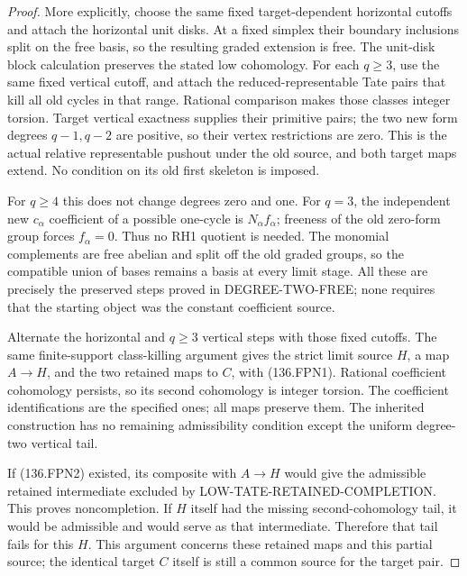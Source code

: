 \begin{proof}
More explicitly, choose the same fixed target-dependent horizontal
cutoffs and attach the horizontal unit disks. At a fixed simplex
their boundary inclusions split on the free basis, so the resulting
graded extension is free. The unit-disk block calculation preserves
the stated low cohomology. For each \(q\geq3\), use the same
fixed vertical cutoff, and attach the reduced-representable Tate
pairs that kill all old cycles in that range. Rational comparison
makes those classes integer torsion. Target vertical exactness
supplies their primitive pairs; the two new form degrees
\(q-1,q-2\) are positive, so their vertex restrictions are zero.
This is the actual relative representable pushout under the old
source, and both target maps extend. No condition on its old
first skeleton is imposed.

For \(q\geq4\) this does not change degrees zero and one.
For \(q=3\), the independent new \(c_\alpha\) coefficient
of a possible one-cycle is \(N_\alpha f_\alpha\); freeness
of the old zero-form group forces \(f_\alpha=0\).
Thus no RH1 quotient is needed. The monomial complements are
free abelian and split off the old graded groups, so the compatible
union of bases remains a basis at every limit stage.
All these are precisely the preserved steps proved in
DEGREE-TWO-FREE; none requires that the starting object was
the constant coefficient source.

Alternate the horizontal and \(q\geq3\) vertical steps with those
fixed cutoffs. The same finite-support class-killing argument gives
the strict limit source \(H\), a map \(A\to H\), and the two
retained maps to \(C\), with (136.FPN1). Rational coefficient
cohomology persists, so its second cohomology is integer torsion.
The coefficient identifications are the specified ones; all maps
preserve them. The inherited construction has no remaining
admissibility condition except the uniform degree-two vertical tail.

If (136.FPN2) existed, its composite with \(A\to H\) would
give the admissible retained intermediate excluded by
LOW-TATE-RETAINED-COMPLETION. This proves noncompletion.
If \(H\) itself had the missing second-cohomology tail, it
would be admissible and would serve as that intermediate.
Therefore that tail fails for this \(H\).
This argument concerns these retained maps and this partial source;
the identical target \(C\) itself is still a common source for
the target pair.
\end{proof}

